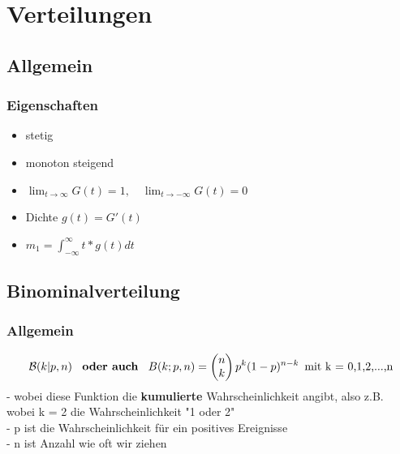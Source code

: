 \documentclass{article}
\begin{document}
\section{Verteilungen}
\subsection{Allgemein}
\subsubsection{Eigenschaften}
\begin{itemize}		
	\item stetig
	\item monoton steigend
	\item $\lim_{t \to \infty} G(t) = 1, \quad \lim_{t \to -\infty} G(t) = 0$
	\item Dichte $g(t) = G'(t)$
	\item $m_1 = \int_{-\infty}^{\infty}t*g(t)dt$
\end{itemize}
\subsection{Binominalverteilung}
\subsubsection{Allgemein}
\[
	\mathcal{B}(k | p,n) \enspace \textbf{ oder auch } \enspace B(k;p,n) =
\begin{pmatrix} n \\ k \end{pmatrix} p^k(1-p)^{n-k} \enspace \newline
\text{mit k = 0,1,2,...,n} \]
- wobei diese Funktion die \textbf{kumulierte} Wahrscheinlichkeit angibt, also z.B.
wobei k = 2 die Wahrscheinlichkeit "1 oder 2"
\\ - p ist die Wahrscheinlichkeit f\"ur ein positives Ereignisse
\\ - n ist Anzahl wie oft wir ziehen
\end{document}
